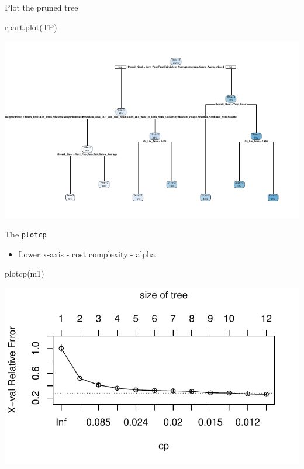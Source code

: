 \documentclass[
  10pt,
  ignorenonframetext,
]{beamer}
\newenvironment{Shaded}{}{}
\newcommand{\KeywordTok}[1]{\textcolor[rgb]{0.00,0.00,1.00}{#1}}
\newcommand{\NormalTok}[1]{#1}
\providecommand{\tightlist}{%
  \setlength{\itemsep}{0pt}\setlength{\parskip}{0pt}}
\begin{document}
\begin{frame}[fragile]{Plot the pruned tree}
\protect\hypertarget{plot-the-pruned-tree}{}

\begin{Shaded}
\begin{Highlighting}[]
\KeywordTok{rpart.plot}\NormalTok{(TP)}
\end{Highlighting}
\end{Shaded}

\includegraphics{c1_trees_bagging_files/figure-beamer/unnamed-chunk-9-1.pdf}

\end{frame}

\begin{frame}[fragile]{The \texttt{plotcp}}
\protect\hypertarget{the-plotcp}{}

\begin{itemize}
\tightlist
\item
  Lower x-axis - cost complexity - alpha
\end{itemize}

\begin{Shaded}
\begin{Highlighting}[]
\KeywordTok{plotcp}\NormalTok{(m1)}
\end{Highlighting}
\end{Shaded}

\includegraphics{c1_trees_bagging_files/figure-beamer/unnamed-chunk-10-1.pdf}

\end{frame}
\end{document}
